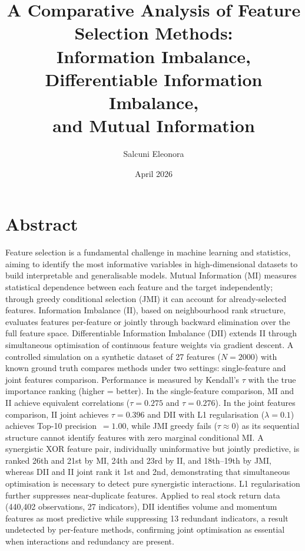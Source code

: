 \documentclass[11pt]{article}
\title{A Comparative Analysis of Feature Selection Methods:\\
Information Imbalance, Differentiable Information Imbalance,\\
and Mutual Information}
\author{Salcuni Eleonora}
\date{April 2026}
\begin{document}
\maketitle

\section*{Abstract}

Feature selection is a fundamental challenge in machine learning and
statistics, aiming to identify the most informative variables in
high-dimensional datasets to build interpretable and generalisable models.
Mutual Information (MI) measures statistical dependence between each
feature and the target independently; through greedy conditional
selection (JMI) it can account for already-selected features.
Information Imbalance (II), based on neighbourhood rank structure,
evaluates features per-feature or jointly through backward elimination
over the full feature space.
Differentiable Information Imbalance (DII) extends II through
simultaneous optimisation of continuous feature weights via gradient
descent.
A controlled simulation on a synthetic dataset of 27 features
($N=2000$) with known ground truth compares methods under two
settings: single-feature and joint features comparison.
Performance is measured by Kendall's $\tau$ with the true
importance ranking (higher = better).
In the single-feature comparison, MI and II achieve equivalent
correlations ($\tau=0.275$ and $\tau=0.276$).
In the joint features comparison, II joint achieves $\tau=0.396$
and DII with L1 regularisation ($\lambda=0.1$) achieves
Top-10 precision~$=1.00$, while JMI greedy fails ($\tau \approx 0$)
as its sequential structure cannot identify features with zero
marginal conditional MI.
A synergistic XOR feature pair, individually uninformative but jointly
predictive, is ranked 26th and 21st by MI, 24th and 23rd by II, and
18th--19th by JMI, whereas DII and II joint rank it 1st and 2nd,
demonstrating that simultaneous optimisation is necessary to detect
pure synergistic interactions.
L1 regularisation further suppresses near-duplicate features.
Applied to real stock return data (440,402 observations, 27 indicators),
DII identifies volume and momentum features as most predictive while
suppressing 13 redundant indicators, a result undetected by per-feature
methods, confirming joint optimisation as essential when interactions
and redundancy are present.
\end{document}
